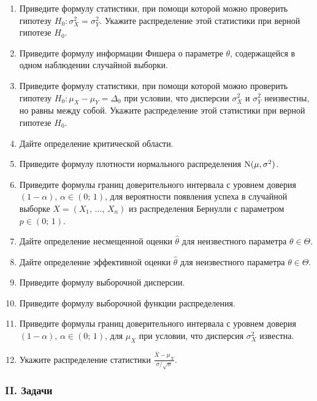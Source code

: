 \begin{enumerate}
  \item Приведите формулу статистики, при помощи которой можно проверить гипотезу
	$H_0 \colon \sigma_X^2 = \sigma_Y^2$. Укажите распределение этой статистики при
	верной гипотезе $H_0$.
  \item Приведите формулу информации Фишера о параметре $\theta$, содержащейся в
	одном наблюдении случайной выборки.
  \item Приведите формулу статистики, при помощи которой можно проверить гипотезу
	$H_0 \colon \mu_X - \mu_Y = \Delta_0$ при условии, что дисперсии $\sigma_X^2$
	и $\sigma_Y^2$ неизвестны, но равны между собой. Укажите распределение этой
	статистики при верной гипотезе $H_0$.
  \item Дайте определение критической области.
  \item Приведите формулу плотности нормального распределения $\mathrm{N}(\mu, \sigma^2)$.
  \item Приведите формулы границ доверительного интервала с уровнем доверия
	$(1 - \alpha)$, $\alpha \in (0;\,1)$, для вероятности появления успеха в
	случайной выборке $X = (X_1, \, \ldots, \, X_n)$ из распределения Бернулли с
	параметром $p \in (0;\,1)$.
  \item Дайте определение несмещенной оценки $\hat{\theta}$ для неизвестного
	параметра $\theta \in \Theta$.
  \item Дайте определение эффективной оценки $\hat{\theta}$ для неизвестного
	параметра $\theta \in \Theta$.
  \item Приведите формулу выборочной дисперсии.
  \item Приведите формулу выборочной функции распределения.
  \item Приведите формулы границ доверительного интервала с уровнем доверия
	$(1 - \alpha)$, $\alpha \in (0;\,1)$, для $\mu_X$ при условии, что дисперсия
	$\sigma_X^2$ известна.
  \item Укажите распределение статистики $\frac{\overline{X} - \mu_X}{\sigma / \sqrt{n}}$.
\end{enumerate}


\subsubsection*{II. Задачи}

